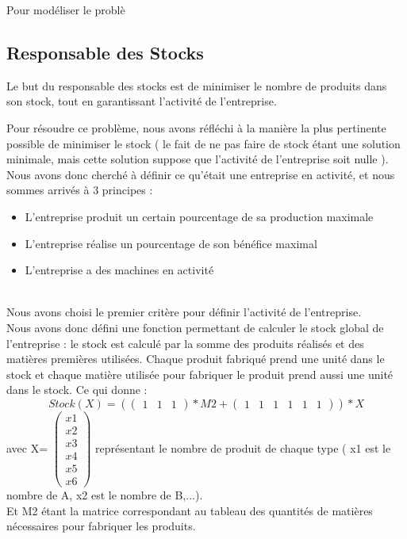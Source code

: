 \documentclass{article}
\begin{document}
Pour modéliser le problè

\subsection{Responsable des Stocks}

Le but du responsable des stocks est de minimiser le nombre de produits dans son stock, tout en garantissant l'activité de l'entreprise.

Pour résoudre ce problème, nous avons réfléchi à la manière la plus pertinente possible de minimiser le stock ( le fait de ne pas faire de stock étant une solution minimale, mais cette solution suppose que l'activité de l'entreprise soit nulle ). Nous avons donc cherché à définir ce qu'était une entreprise en activité, et nous sommes arrivés à 3 principes  :
\begin{itemize} 
\item L'entreprise produit un certain pourcentage de sa production maximale
\item L'entreprise réalise un pourcentage de son bénéfice maximal
\item L'entreprise a des machines en activité
\end{itemize} \ \\ 

Nous avons choisi le premier critère pour définir l'activité de l'entreprise. \\
Nous avons donc défini une fonction permettant de calculer le stock global de l'entreprise : le stock est calculé par la somme des produits réalisés et des matières premières utilisées. Chaque produit fabriqué prend une unité dans le stock et chaque matière utilisée pour fabriquer le produit prend aussi une unité dans le stock. Ce qui donne :
\[
   Stock(X) =  
   (
   \begin{pmatrix} 
   1 & 1 & 1 
   \end{pmatrix}
   * M2 +
   \begin{pmatrix} 
   1 & 1 & 1 & 1 & 1 & 1
   \end{pmatrix} 
   )*X
   \]
 avec X= $\begin{pmatrix} 
   x1 \\ 
   x2 \\
   x3 \\
   x4 \\
   x5 \\ 
   x6 
  \end{pmatrix}$ représentant le nombre de produit de chaque type ( x1 est le nombre de A, x2 est le nombre de B,...). \\
  Et M2 étant la matrice correspondant au tableau des quantités de matières nécessaires pour fabriquer les produits. \\
  
\end{document}
